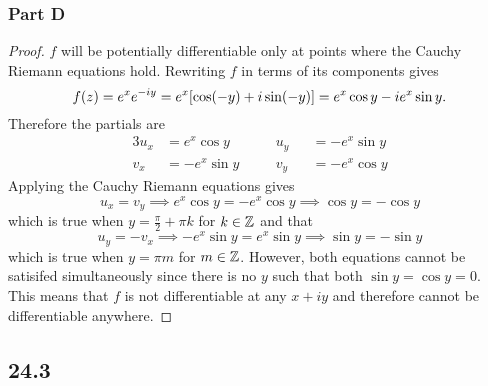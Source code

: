 \documentclass[12pt,titlepage]{extarticle}
\begin{document}
\subsubsection*{Part D}
\begin{proof}
    $f$ will be potentially differentiable only at points where the Cauchy Riemann equations hold. Rewriting $f$ in terms of its components gives
    \[
        f(z) = e^x e^{-iy} = e^x \qty[\cos(-y) + i \sin(-y)] = e^x \cos y - i e^x \sin y
    .\]
    Therefore the partials are
    \begin{alignat*}{3}
        u_x &= e^x \cos y &\quad& u_y &&= -e^x \sin y \\
        v_x &= -e^x \sin y && v_y &&= -e^x \cos y
    \end{alignat*}
    Applying the Cauchy Riemann equations gives
    \[
        u_x = v_y \implies e^x \cos y = -e^x \cos y \implies \cos y = -\cos y
    \]
    which is true when $y = \frac{\pi}{2} + \pi k$ for $k \in \mathbb{Z}$ and that
    \[
        u_y = -v_x \implies -e^x \sin y = e^x \sin y \implies \sin y = -\sin y
    \]
    which is true when $y = \pi m$ for $m \in \mathbb{Z}$. However, both equations cannot be satisifed simultaneously since there is no $y$ such that both $\sin y = \cos y = 0$. This means that $f$ is not differentiable at any $x + iy$ and therefore cannot be differentiable anywhere.
\end{proof}

\subsection*{24.3}
\end{document}
